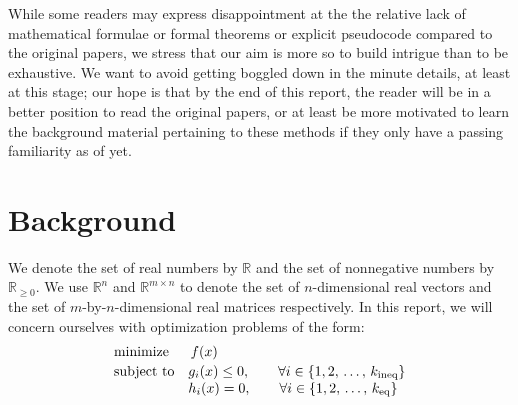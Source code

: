 \documentclass[12pt]{article}
\newcommand{\1}{\scalebox{1.06}{\ensuremath{\mathrel{\mathmybb{1}}}}}
\theoremstyle{definition}
\newcommand{\defn}[1]{\underline{#1}}
\newcommand{\R}{\mathbb{R}}
\begin{document}
While some readers may express disappointment at the the relative lack of mathematical formulae or formal theorems or explicit pseudocode compared to the original papers, we stress that our aim is more so to build intrigue than to be exhaustive. We want to avoid getting boggled down in the minute details, at least at this stage; our hope is that by the end of this report, the reader will be in a better position to read the original papers, or at least be more motivated to learn the background material pertaining to these methods if they only have a passing familiarity as of yet.

\section*{Background}
We denote the set of real numbers by $\R$ and the set of nonnegative numbers by $\R_{\geq 0}$.
We use $\R^n$ and $\R^{m \times n}$ to denote the set of $n$-dimensional real vectors and the set of $m$-by-$n$-dimensional real matrices respectively.
In this report, we will concern ourselves with optimization problems of the form:
\[
\begin{array}{l@{}l}
	\text{minimize\quad}  & \,f(x) \vspace{0.2em} \\
	\text{subject to\quad}& g_i(x) \leq 0,\qquad \forall i \in \{1, 2,\, \dots,\, k_\text{ineq}\}  \\
	&h_i(x) = 0,\qquad \forall i \in \{1, 2,\, \dots,\, k_\text{eq}\}
\end{array}
\]
\end{document}
